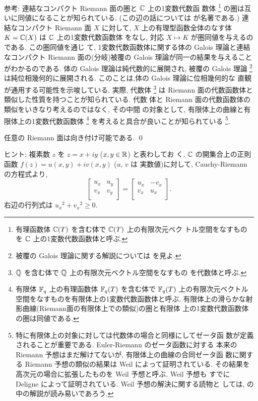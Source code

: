 \documentclass[12pt,twoside]{jarticle}
\def\Q{{\Bbb Q}} %
\def\R{{\Bbb R}} %
\def\C{{\Bbb C}} %
\def\F{{\Bbb F}}
\begin{document}
\noindent 参考: 連結なコンパクト Riemann 面の圏と $\C$ 上の1変数代数函
数体%
\footnote{有理函数体 $\C(T)$ を含む体で $\C(T)$ 上の有限次元ベク
  トル空間をなすものを $\C$ 上の1変数代数函数体と呼ぶ.}%
の圏は互いに同値になることが知られている. (この辺の話については 
\cite{Iwasawa} が名著である.) 連結なコンパクト Riemann 面 $X$ に対して,
$X$ 上の有理型函数全体のなす体 $K = \C(X)$ は $\C$ 上の1変数代数函数体
をなし, 対応 $X \mapsto K$ が圏同値を与えるのである. この圏同値を通じ
て, 1変数代数函数体に関する体の Galois 理論と連結なコンパクト Riemann 
面の(分岐)被覆の Galois 理論が同一の結果を与えることがわかるのである. 
体の Galois 理論は純代数的に展開され, 被覆の Galois 理論%
\footnote{被覆の Galois 理論に関する解説については \cite{Kuga1} を見よ.}%
は純位相幾何的に展開される. このことは,体の Galois 理論に位相幾何的な
直観が通用する可能性を示唆している.
実際, 代数体%
\footnote{$\Q$ を含む体で $\Q$ 上の有限次元ベクトル空間をなすもの
  を代数体と呼ぶ.}%
は Riemann 面の代数函数体と類似した性質を持つことが知られている. 代数
体と Riemann 面の代数函数体の類似をいきなり考えるのではなく, その中間
の対象として, 有限体上の曲線と有限体上の1変数代数函数体%
\footnote{有限体 $\F_q$ 上の有理函数体 $\F_q(T)$ を含む体で $\F_q(T)$ 
  上の有限次元ベクトル空間をなすものを有限体上の1変数代数函数体と呼ぶ.
  有限体上の滑らかな射影曲線(Riemann面の有限体上での類似)の圏と有限体
  上の1変数代数函数体の圏は同値である.}%
を考えると具合が良いことが知られている%
\footnote{特に有限体上の対象に対しては代数体の場合と同様にしてゼータ函
  数が定義されることが重要である.  Euler-Riemann のゼータ函数に対する
  本来の Riemann 予想はまだ解けてないが, 有限体上の曲線の合同ゼータ函
  数に関する Riemann 予想の類似の結果は Weil によって証明されている. 
  その結果を高次元の場合に拡張したものを Weil 予想と呼ぶ. Weil 予想も
  すでに Deligne によって証明されている. Weil 予想の解決に関する読物と
  しては, \cite{Kuga2} の中の解説が読み易いであろう.}.

\begin{question}
  任意の Riemann 面は向き付け可能である. \qed
\end{question}

\noindent ヒント: 複素数 $z$ を $z = x + iy$ ($x,y\in\R$) と表わしてお
く. $\C$ の開集合上の正則函数 $f(z) = u(x,y) + i v(x,y)$ ($u$, $v$ は
実数値)に対して, Cauchy-Riemann の方程式より,
\[
  \begin{bmatrix}
    u_x & u_y \\
    v_x & v_y \\
  \end{bmatrix}
  =
  \begin{bmatrix}
    u_x & - v_x \\
    v_x & u_x \\
  \end{bmatrix}.
\]
右辺の行列式は ${u_x}^2 + {v_x}^2 \ge 0$. 
\end{document}
